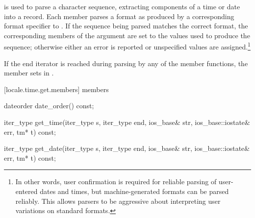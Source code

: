\pnum
{}
is used to
parse a character sequence, extracting components of a time or date
into a
record.
Each
member parses a format as produced by a corresponding format specifier to
.
If the sequence being parsed matches the correct format, the corresponding
members of the
argument are set to the values used to produce the sequence; otherwise
either an error is reported or unspecified values are assigned.\footnote{In
other words, user confirmation is required for reliable parsing of
user-entered dates and times, but machine-generated formats can be
parsed reliably.
This allows parsers to be aggressive about
interpreting user variations on standard formats.}

\pnum
If the end iterator is reached during parsing by any of the
member functions, the member sets
in .

[locale.time.get.members]{ members}

%
%
\begin{itemdecl}
dateorder date_order() const;
\end{itemdecl}

\begin{itemdescr}
\pnum
\returns
{}
\end{itemdescr}

%
%
\begin{itemdecl}
iter_type get_time(iter_type s, iter_type end, ios_base& str,
                   ios_base::iostate& err, tm* t) const;
\end{itemdecl}

\begin{itemdescr}
\pnum
\returns
{}
\end{itemdescr}

%
%
\begin{itemdecl}
iter_type get_date(iter_type s, iter_type end, ios_base& str,
                   ios_base::iostate& err, tm* t) const;
\end{itemdecl}

\begin{itemdescr}
\pnum
\returns
{}
\end{itemdescr}

